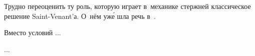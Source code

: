 \begin{otherlanguage}{russian}

Трудно переоценить ту роль, которую играет в~механике стержней классическое решение Saint\hbox{-\hspace{-0.2ex}}Venant’а. О~нём уж\'{е} шла речь в~.

Вместо условий ...

...



\end{otherlanguage}




